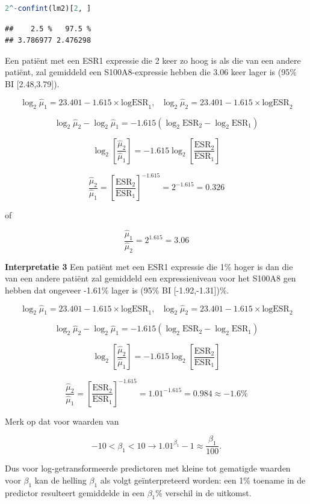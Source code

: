 \documentclass[
  12pt,dutch,coursenotes]{book}
\theoremstyle{definition}
\theoremstyle{definition}
\theoremstyle{definition}
\theoremstyle{definition}
\theoremstyle{remark}
\begin{document}
\begin{lstlisting}[language=R]
2^-confint(lm2)[2, ]
\end{lstlisting}

\begin{lstlisting}
##    2.5 %   97.5 % 
## 3.786977 2.476298
\end{lstlisting}

Een patiënt met een ESR1 expressie die 2 keer zo hoog is als die van een andere patiënt, zal gemiddeld een S100A8-expressie hebben die 3.06 keer lager is (95\% BI {[}2.48,3.79{]}).

\[\log_2 \hat\mu_1=23.401  -1.615 \times \text{logESR}_1,\text{ } \log_2 \hat\mu_2=23.401  -1.615 \times \text{logESR}_2 \]

\[\log_2 \hat\mu_2-\log_2 \hat\mu_1=  -1.615 (\log_2 \text{ESR}_2-\log_2 \text{ESR}_1) \]

\[\log_2 \left[\frac{\hat\mu_2}{\hat\mu_1}\right]=  -1.615 \log_2\left[\frac{ \text{ESR}_2}{\text{ESR}_1}\right] \]

\[\frac{\hat\mu_2}{\hat\mu_1}=\left[\frac{ \text{ESR}_2}{\text{ESR}_1}\right]^{-1.615}=2^ {-1.615} =0.326\]

of

\[\frac{\hat\mu_1}{\hat\mu_2}=2^{1.615} =3.06\]

\textbf{Interpretatie 3}
Een patiënt met een ESR1 expressie die 1\% hoger is dan die van een andere patiënt zal gemiddeld een expressieniveau voor het S100A8 gen hebben dat ongeveer -1.61\% lager is (95\% BI {[}-1.92,-1.31{]})\%.

\[\log_2 \hat\mu_1=23.401  -1.615 \times \text{logESR}_1,\text{ } \log_2 \hat\mu_2=23.401  -1.615 \times \text{logESR}_2 \]

\[\log_2 \hat\mu_2-\log_2 \hat \mu_1=  -1.615 (\log_2 \text{ESR}_2-\log_2 \text{ESR}_1) \]

\[\log_2 \left[\frac{\hat\mu_2}{\hat\mu_1}\right]=  -1.615 \log_2\left[\frac{ \text{ESR}_2}{\text{ESR}_1}\right] \]

\[\frac{\hat\mu_2}{\hat\mu_1}=\left[\frac{ \text{ESR}_2}{\text{ESR}_1}\right]^{-1.615}=1.01^ {-1.615} =0.984 \approx -1.6\%\]

Merk op dat voor waarden van

\[−10< \beta_1<10 \rightarrow 1.01 ^{\beta_1}−1 \approx \frac{\beta_1}{100}.\]

Dus voor log-getransformeerde predictoren met kleine tot gematigde waarden voor \(\beta_1\) kan de helling \(\beta_1\) als volgt geïnterpreteerd worden: een 1\% toename in de predictor resulteert gemiddelde in een \(\beta_1\)\% verschil in de uitkomst.
\end{document}
